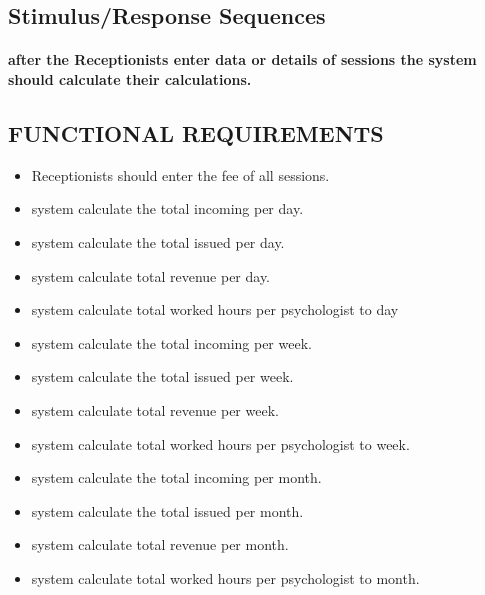 \documentclass[../Psychological_system_web_application.tex]{subfiles}
\begin{document}
				\subsection{Stimulus/Response Sequences}
					\paragraph{after the \gls{Receptionists} enter data or details of sessions the system should calculate their calculations.}
					
				\subsection{FUNCTIONAL REQUIREMENTS}
					\begin{itemize}
						\item
							\gls{Receptionists} should enter the fee of all sessions.
						\item
							system calculate the total incoming per day.
						\item
							system calculate the total issued per day.
						\item
							system calculate total revenue per day.
						
						\item
							system calculate total worked hours per \gls{psychologist} to day						
						\item
							system calculate the total incoming per week.
						\item
							system calculate the total issued per week.
						\item
							system calculate total revenue per week.
						\item
							system calculate total worked hours per \gls{psychologist} to week. 
						
						\item
							system calculate the total incoming per month.
						\item
							system calculate the total issued per month.
						\item
							system calculate total revenue per month.
						\item
							system calculate total worked hours per \gls{psychologist} to month.					
					\end{itemize}
	
\end{document}

